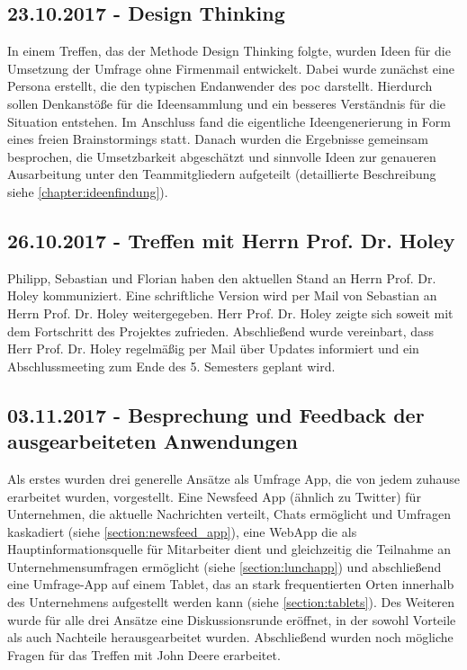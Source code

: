 \subsection{23.10.2017 - Design Thinking}
In einem Treffen, das der Methode Design Thinking folgte, wurden Ideen für die Umsetzung der Umfrage ohne Firmenmail entwickelt. Dabei wurde zunächst eine Persona erstellt, die den typischen Endanwender des \gls{poc} darstellt. Hierdurch sollen Denkanstöße für die Ideensammlung und ein besseres Verständnis für die Situation entstehen. Im Anschluss fand die eigentliche Ideengenerierung in Form eines freien Brainstormings statt. Danach wurden die Ergebnisse gemeinsam besprochen, die Umsetzbarkeit abgeschätzt und sinnvolle Ideen zur genaueren Ausarbeitung unter den Teammitgliedern aufgeteilt (detaillierte Beschreibung siehe \vref{chapter:ideenfindung}).

\subsection{26.10.2017 - Treffen mit Herrn Prof. Dr. Holey}
Philipp, Sebastian und Florian haben den aktuellen Stand an Herrn Prof. Dr. Holey kommuniziert. Eine schriftliche Version wird per Mail von Sebastian an Herrn Prof. Dr. Holey weitergegeben. Herr Prof. Dr. Holey zeigte sich soweit mit dem Fortschritt des Projektes zufrieden. Abschließend wurde vereinbart, dass Herr Prof. Dr. Holey regelmäßig per Mail über Updates informiert und ein Abschlussmeeting zum Ende des 5. Semesters geplant wird.

\subsection{03.11.2017 - Besprechung und Feedback der ausgearbeiteten Anwendungen}
Als erstes wurden drei generelle Ansätze als Umfrage App, die von jedem zuhause erarbeitet wurden, vorgestellt. Eine Newsfeed App (ähnlich zu Twitter) für Unternehmen, die aktuelle Nachrichten verteilt, Chats ermöglicht und Umfragen kaskadiert (siehe \vref{section:newsfeed_app}), eine WebApp die als Hauptinformationsquelle für Mitarbeiter dient und gleichzeitig die Teilnahme an Unternehmensumfragen ermöglicht (siehe \vref{section:lunchapp}) und abschließend eine Umfrage-App auf einem Tablet, das an stark frequentierten Orten innerhalb des Unternehmens aufgestellt werden kann (siehe \vref{section:tablets}). Des Weiteren wurde für alle drei Ansätze eine Diskussionsrunde eröffnet, in der sowohl Vorteile als auch Nachteile herausgearbeitet wurden. Abschließend wurden noch mögliche Fragen für das Treffen mit John Deere erarbeitet.

